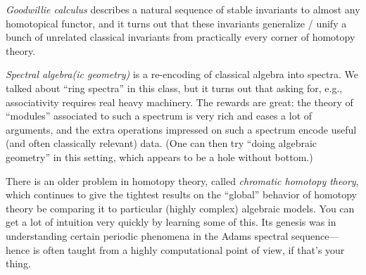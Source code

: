 \textit{Goodwillie calculus} describes a natural sequence of stable invariants to almost any homotopical functor, and it turns out that these invariants generalize / unify a bunch of unrelated classical invariants from practically every corner of homotopy theory.

\textit{Spectral algebra(ic geometry)} is a re-encoding of classical algebra into spectra.  We talked about ``ring spectra'' in this class, but it turns out that asking for, e.g., associativity requires real heavy machinery.  The rewards are great: the theory of ``modules'' associated to such a spectrum is very rich and eases a lot of arguments, and the extra operations impressed on such a spectrum encode useful (and often classically relevant) data.  (One can then try ``doing algebraic geometry'' in this setting, which appears to be a hole without bottom.)

There is an older problem in homotopy theory, called \textit{chromatic homotopy theory}, which continues to give the tightest results on the ``global'' behavior of homotopy theory be comparing it to particular (highly complex) algebraic models.  You can get a lot of intuition very quickly by learning some of this.  Its genesis was in understanding certain periodic phenomena in the Adams spectral sequence---hence is often taught from a highly computational point of view, if that's your thing.